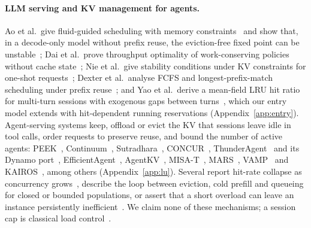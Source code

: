 \paragraph{LLM serving and KV management for agents.} Ao et al.\ give fluid-guided scheduling with memory
constraints~\citep{ao2025wait} and show that, in a decode-only model without prefix reuse, the eviction-free fixed point can be
unstable~\citep{ao2026service}; Dai et al.\ prove throughput optimality of work-conserving policies without cache
state~\citep{dai2025throughput}; Nie et al.\ give stability conditions under KV constraints for one-shot
requests~\citep{nie2026queueing}; Dexter et al.\ analyse FCFS and longest-prefix-match scheduling under prefix
reuse~\citep{dexter2025prefix}; and Yao et al.\ derive a mean-field LRU hit ratio for multi-turn sessions with exogenous gaps between
turns~\citep{yao2026multiturn}, which our entry model extends with hit-dependent running reservations (Appendix~\ref{app:entry}).
Agent-serving systems keep, offload or evict the KV that sessions leave idle in tool calls, order requests to preserve reuse, and bound
the number of active agents: PEEK~\citep{xie2026peek}, Continuum~\citep{li2025continuum}, Sutradhara~\citep{biswas2026sutradhara},
CONCUR~\citep{chen2026concur}, ThunderAgent~\citep{kang2026thunderagent} and its Dynamo port~\citep{dhanani2026dynamo},
EfficientAgent~\citep{shao2026efficientagent}, AgentKV~\citep{anon2026agentkv}, MISA-T~\citep{hong2026misat},
MARS~\citep{wang2026mars}, VAMP~\citep{kim2026vamp} and KAIROS~\citep{yuan2026kairos}, among others (Appendix~\ref{app:lu}). Several
report hit-rate collapse as concurrency grows~\citep{chen2026concur,yuan2026agentic,hong2026misat,kim2026vamp}, describe the loop
between eviction, cold prefill and queueing for closed or bounded populations, or assert that a short overload can leave an instance
persistently inefficient~\citep{yuan2026kairos}. We claim none of these mechanisms; a session cap is classical load
control~\citep{denning1976optimal,cherkasova2002session}.
